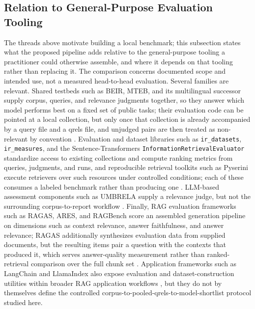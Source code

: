 \subsection{Relation to General-Purpose Evaluation Tooling}\label{rw-tooling}

The threads above motivate building a local benchmark; this subsection states what the proposed pipeline adds relative to the general-purpose tooling a practitioner could otherwise assemble, and where it depends on that tooling rather than replacing it. The comparison concerns documented scope and intended use, not a measured head-to-head evaluation. Several families are relevant. Shared testbeds such as BEIR, MTEB, and its multilingual successor supply corpus, queries, and relevance judgments together, so they answer which model performs best on a fixed set of public tasks; their evaluation code can be pointed at a local collection, but only once that collection is already accompanied by a query file and a qrels file, and unjudged pairs are then treated as non-relevant by convention \citep{Thakur_BEIR_2021, Muennighoff_MTEB_2023, enevoldsen2025mmteb}. Evaluation and dataset libraries such as \texttt{ir\_datasets}, \texttt{ir\_measures}, and the Sentence-Transformers \texttt{InformationRetrievalEvaluator} standardize access to existing collections and compute ranking metrics from queries, judgments, and runs, and reproducible retrieval toolkits such as Pyserini execute retrievers over such resources under controlled conditions; each of these consumes a labeled benchmark rather than producing one \citep{macavaney2021irdatasets, macavaney2022irmeasures, reimers2019sentencebert, lin2021pyserini}. LLM-based assessment components such as UMBRELA supply a relevance judge, but not the surrounding corpus-to-report workflow \citep{upadhyay2024umbrela}. Finally, RAG evaluation frameworks such as RAGAS, ARES, and RAGBench score an assembled generation pipeline on dimensions such as context relevance, answer faithfulness, and answer relevance; RAGAS additionally synthesizes evaluation data from supplied documents, but the resulting items pair a question with the contexts that produced it, which serves answer-quality measurement rather than ranked-retrieval comparison over the full chunk set \citep{es2024ragas, saadfalcon2024ares, friel2024ragbench}. Application frameworks such as LangChain and LlamaIndex also expose evaluation and dataset-construction utilities within broader RAG application workflows \citep{langchain2022, llamaindex2022}, but they do not by themselves define the controlled corpus-to-pooled-qrels-to-model-shortlist protocol studied here.

